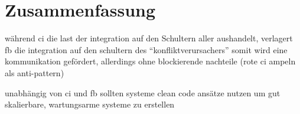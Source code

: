 \chapter{Zusammenfassung}

während ci die last der integration auf den Schultern aller aushandelt, verlagert fb die integration auf den schultern des ``konfliktverursachers'' somit wird eine kommunikation gefördert, allerdings ohne blockierende nachteile (rote ci ampeln als anti-pattern)

unabhängig von ci und fb sollten systeme clean code ansätze nutzen um gut skalierbare, wartungsarme systeme zu erstellen